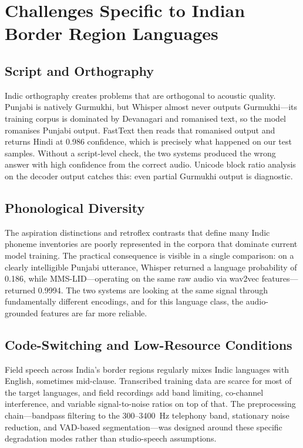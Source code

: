 \documentclass[12pt, onecolumn]{IEEEtran}
\begin{document}
\section{Challenges Specific to Indian Border Region Languages}

\subsection{Script and Orthography}

Indic orthography creates problems that are orthogonal to acoustic quality. Punjabi is natively Gurmukhi, but Whisper almost never outputs Gurmukhi---its training corpus is dominated by Devanagari and romanised text, so the model romanises Punjabi output. FastText then reads that romanised output and returns Hindi at 0.986 confidence, which is precisely what happened on our test samples. Without a script-level check, the two systems produced the wrong answer with high confidence from the correct audio. Unicode block ratio analysis on the decoder output catches this: even partial Gurmukhi output is diagnostic.

\subsection{Phonological Diversity}

The aspiration distinctions and retroflex contrasts that define many Indic phoneme inventories are poorly represented in the corpora that dominate current model training. The practical consequence is visible in a single comparison: on a clearly intelligible Punjabi utterance, Whisper returned a language probability of 0.186, while MMS-LID---operating on the same raw audio via wav2vec features---returned 0.9994. The two systems are looking at the same signal through fundamentally different encodings, and for this language class, the audio-grounded features are far more reliable.

\subsection{Code-Switching and Low-Resource Conditions}

Field speech across India's border regions regularly mixes Indic languages with English, sometimes mid-clause. Transcribed training data are scarce for most of the target languages, and field recordings add band limiting, co-channel interference, and variable signal-to-noise ratios on top of that. The preprocessing chain---bandpass filtering to the 300--3400~Hz telephony band, stationary noise reduction, and VAD-based segmentation---was designed around these specific degradation modes rather than studio-speech assumptions.
\end{document}
